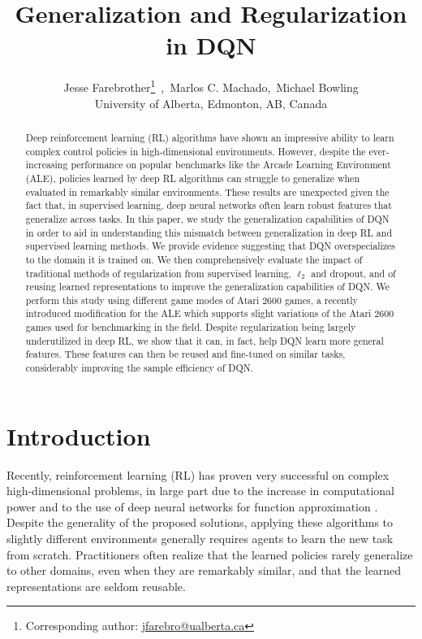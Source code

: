 \documentclass{article}
\title{Generalization and Regularization in DQN}
\author{
    Jesse Farebrother{\normalfont\thanks{Corresponding author: \href{mailto:jfarebro@ualberta.ca}{jfarebro@ualberta.ca}}} \,,\, Marlos C. Machado,\, Michael Bowling \\[0.5mm]
    \hspace{0mm}
    University of Alberta, Edmonton, AB, Canada\ignorespaces
}
\begin{document}
\maketitle

\begin{abstract}
Deep reinforcement learning (RL) algorithms have shown an impressive ability to learn complex control policies in high-dimensional environments. However, despite the ever-increasing performance on popular benchmarks like the Arcade Learning Environment (ALE), policies learned by deep RL algorithms can struggle to generalize when evaluated in remarkably similar environments. These results are unexpected given the fact that, in supervised learning, deep neural networks often learn robust features that generalize across tasks. 
In this paper, we study the generalization capabilities of DQN in order to aid in understanding this mismatch between generalization in deep RL and supervised learning methods.
We provide evidence suggesting that DQN overspecializes to the domain it is trained on.
We then comprehensively evaluate the impact of traditional methods of regularization from supervised learning, $\ell_2$ and dropout, and of reusing learned representations to improve the generalization capabilities of DQN.
We perform this study using different game modes of Atari 2600 games, a recently introduced modification for the ALE which supports slight variations of the Atari 2600 games used for benchmarking in the field.
Despite regularization being largely underutilized in deep RL, we show that it can, in fact, help DQN learn more general features. These features can then be reused and fine-tuned on similar tasks, considerably improving the sample efficiency of DQN.
\end{abstract}

\section{Introduction}

Recently, reinforcement learning (RL) has proven very successful on complex high-dimensional problems, in large part due to the increase in computational power and to the use of deep neural networks for function approximation \citep[e.g.,][]{Mnih15,Silver16}. Despite the generality of the proposed solutions, applying these algorithms to slightly different environments generally requires agents to learn the new task from scratch. Practitioners often realize that the learned policies rarely generalize to other domains, even when they are remarkably similar, and that the learned representations are seldom reusable.
\end{document}
